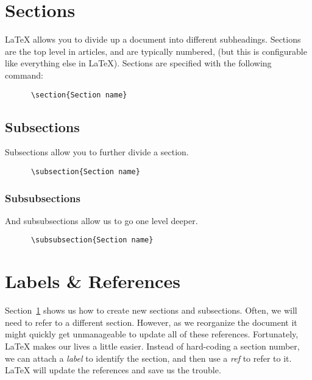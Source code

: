 \documentclass{article}
\begin{document}
\section{Sections}\label{sec:section}
LaTeX allows you to divide up a document into different subheadings.
Sections are the top level in articles, and are typically numbered,
(but this is configurable like everything else in LaTeX).
Sections are specified with the following command:
\begin{verbatim}
      \section{Section name}
\end{verbatim}

\subsection{Subsections}
Subsections allow you to further divide a section.
\begin{verbatim}
      \subsection{Section name}
\end{verbatim}

\subsubsection{Subsubsections}
And subsubsections allow us to go one level deeper. 
\begin{verbatim}
      \subsubsection{Section name}
\end{verbatim}


\section{Labels \& References}
Section~\ref{sec:section} shows us how to create new sections
and subsections.
Often, we will need to refer to a different section.
However, as we reorganize the document it might quickly get unmanageable to update all of these references.
Fortunately, LaTeX makes our lives a little easier.
Instead of hard-coding a section number,
we can attach a {\em label} to identify the section,
and then use a {\em ref} to refer to it.
LaTeX will update the references and save us the trouble.
\end{document}

